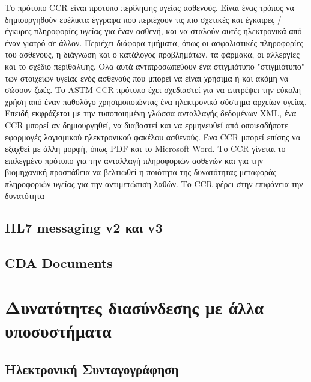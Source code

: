 Το πρότυπο CCR είναι πρότυπο περίληψης υγείας ασθενούς. Είναι ένας τρόπος να δημιουργηθούν ευέλικτα έγγραφα που περιέχουν τις πιο σχετικές και έγκαιρες / έγκυρες πληροφορίες υγείας για έναν ασθενή, και να σταλούν αυτές ηλεκτρονικά από έναν γιατρό σε άλλον. Περιέχει διάφορα τμήματα, όπως οι ασφαλιστικές πληροφορίες του ασθενούς, η διάγνωση και ο κατάλογος προβλημάτων, τα φάρμακα, οι αλλεργίες και το σχέδιο περίθαλψης. Όλα αυτά αντιπροσωπεύουν ένα στιγμιότυπο "στιγμιότυπο" των στοιχείων υγείας ενός ασθενούς που μπορεί να είναι χρήσιμα ή και ακόμη να σώσουν ζωές. Το ASTM CCR πρότυπο έχει σχεδιαστεί για να επιτρέψει την εύκολη χρήση από έναν παθολόγο χρησιμοποιώντας ένα ηλεκτρονικό σύστημα αρχείων υγείας.
Επειδή εκφράζεται με την τυποποιημένη γλώσσα ανταλλαγής δεδομένων XML, ένα CCR μπορεί αν δημιουργηθεί, να διαβαστεί και να ερμηνευθεί από οποιεσδήποτε εφαρμογές λογισμικού ηλεκτρονικού φακέλου ασθενούς. Ένα CCR μπορεί επίσης να εξαχθεί με άλλη μορφή, όπως PDF και το Microsoft Word.
Το CCR γίνεται το επιλεγμένο πρότυπο για την ανταλλαγή πληροφοριών ασθενών και για την βιομηχανική προσπάθεια να βελτιωθεί η ποιότητα της δυνατότητας μεταφοράς πληροφοριών υγείας για την αντιμετώπιση λαθών. Το CCR φέρει στην επιφάνεια την δυνατότητα

	\subsection{HL7 messaging v2 και v3}

	\subsection{CDA Documents}
	

		
\section{Δυνατότητες διασύνδεσης με άλλα υποσυστήματα}

	\subsection{Ηλεκτρονική Συνταγογράφηση}
	
